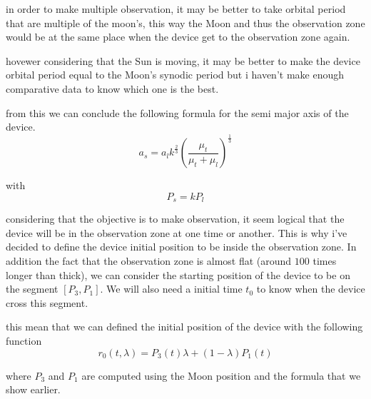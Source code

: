 \documentclass{article} %
\begin{document}
		
		
		
		
		in order to make multiple observation, it may be better to take orbital period that are multiple of the moon's, this way the Moon and thus the observation zone would be at the same place when the device get to the observation zone again.
		
		hovewer considering that the Sun is moving, it may be better to make the device orbital period equal to the Moon's synodic period but i haven't make enough comparative data to know which one is the best.	
		
		from this we can conclude the following formula for the semi major axis of the device.
		$$
		a_s=a_lk^{\frac{2}{3}}\left(\frac{\mu_t}{\mu_t+\mu_l}\right)^\frac{1}{3}
		$$
		
		with
		$$
		P_s=kP_l
		$$
		
		considering that the objective is to make observation, it seem logical that the device will be in the observation zone at one time or another. This is why i've decided to define the device initial position to be inside the observation zone. In addition the fact that the observation zone is almost flat (around $100$ times longer than thick), we can consider the starting position of the device to be on the segment $[P_3,P_1]$. We will also need a initial time $t_0$ to know when the device cross this segment.
		
		this mean that we can defined the initial position of the device with the following function
		$$
		r_0(t,\lambda)=P_3(t)\lambda+(1-\lambda)P_1(t)
		$$
		
		where $P_3$ and $P_1$ are computed using the Moon position and the formula that we show earlier.
		
		
		
		
		
\end{document}
